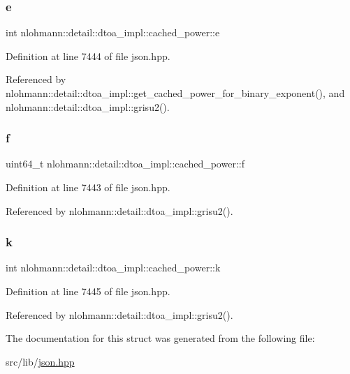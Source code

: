 \subsubsection{\texorpdfstring{e}{e}}
{\footnotesize\ttfamily int nlohmann\+::detail\+::dtoa\+\_\+impl\+::cached\+\_\+power\+::e}



Definition at line 7444 of file json.\+hpp.



Referenced by nlohmann\+::detail\+::dtoa\+\_\+impl\+::get\+\_\+cached\+\_\+power\+\_\+for\+\_\+binary\+\_\+exponent(), and nlohmann\+::detail\+::dtoa\+\_\+impl\+::grisu2().

\mbox{\label{structnlohmann_1_1detail_1_1dtoa__impl_1_1cached__power_a56a47ff88dce47986dd938f2ccb2abbf}} 
\subsubsection{\texorpdfstring{f}{f}}
{\footnotesize\ttfamily uint64\+\_\+t nlohmann\+::detail\+::dtoa\+\_\+impl\+::cached\+\_\+power\+::f}



Definition at line 7443 of file json.\+hpp.



Referenced by nlohmann\+::detail\+::dtoa\+\_\+impl\+::grisu2().

\mbox{\label{structnlohmann_1_1detail_1_1dtoa__impl_1_1cached__power_a8c1f2efed643eeaa8fae83c697a29c6a}} 
\subsubsection{\texorpdfstring{k}{k}}
{\footnotesize\ttfamily int nlohmann\+::detail\+::dtoa\+\_\+impl\+::cached\+\_\+power\+::k}



Definition at line 7445 of file json.\+hpp.



Referenced by nlohmann\+::detail\+::dtoa\+\_\+impl\+::grisu2().



The documentation for this struct was generated from the following file\+:\begin{DoxyCompactItemize}
\item 
src/lib/\hyperlink{json_8hpp}{json.\+hpp}\end{DoxyCompactItemize}
